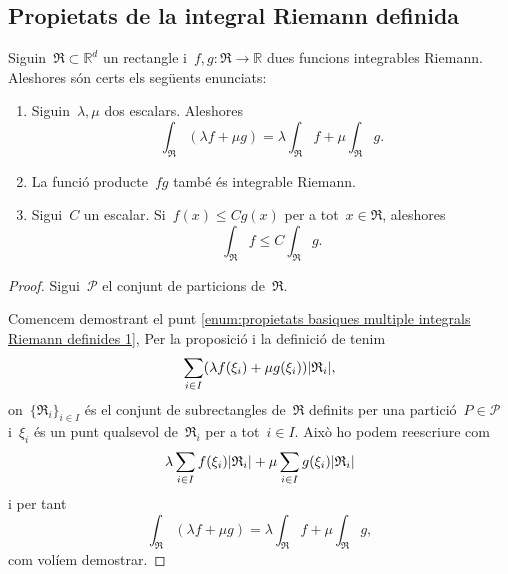\documentclass[../../main.tex]{subfiles}
\begin{document}
    \subsection{Propietats de la integral Riemann definida}
    \begin{proposition}
        \label{prop:propietats basiques multiple integrals Riemann definides}
        Siguin~\(\mathfrak{R}\subset\mathbb{R}^{d}\) un rectangle i~\(f,g\colon\mathfrak{R}\to\mathbb{R}\) dues funcions integrables Riemann.
        Aleshores són certs els següents enunciats:
        \begin{enumerate}
            \item\label{enum:propietats basiques multiple integrals Riemann definides 1} Siguin~\(\lambda,\mu\) dos escalars.
            Aleshores
            \[
                \int_{\mathfrak{R}}(\lambda f+\mu g)=\lambda\int_{\mathfrak{R}}f+\mu\int_{\mathfrak{R}}g.
            \]
            \item\label{enum:propietats basiques multiple integrals Riemann definides 2} La funció producte~\(fg\) també és integrable Riemann.
            \item\label{enum:propietats basiques multiple integrals Riemann definides 3} Sigui~\(C\) un escalar.
            Si~\(f(x)\leq Cg(x)\) per a tot~\(x\in \mathfrak{R}\), aleshores \[\int_{\mathfrak{R}}f\leq C\int_{\mathfrak{R}}g.\]
        \end{enumerate}
        \begin{proof}
            Sigui~\(\mathcal{P}\) el conjunt de particions de~\(\mathfrak{R}\).

            Comencem demostrant el punt \eqref{enum:propietats basiques multiple integrals Riemann definides 1}, Per la proposició  i la definició de  tenim
            \[
                \sum_{i\in I}\left(\lambda f(\xi_{i})+\mu g(\xi_{i})\right)\abs{\mathfrak{R}_{i}},
            \]
            on~\(\{\mathfrak{R}_{i}\}_{i\in I}\) és el conjunt de subrectangles de~\(\mathfrak{R}\) definits per una partició~\(P\in\mathcal{P}\) i~\(\xi_{i}\) és un punt qualsevol de~\(\mathfrak{R}_{i}\) per a tot~\(i\in I\).
            Això ho podem reescriure com
            \[
                \lambda\sum_{i\in I}f(\xi_{i})\abs{\mathfrak{R}_{i}}+\mu\sum_{i\in I}g(\xi_{i})\abs{\mathfrak{R}_{i}}
            \]
            i per tant
            \[
                \int_{\mathfrak{R}}(\lambda f+\mu g)=\lambda\int_{\mathfrak{R}}f+\mu\int_{\mathfrak{R}}g,
            \]
            com volíem demostrar.


\end{proof}
\end{proposition}
\end{document}
